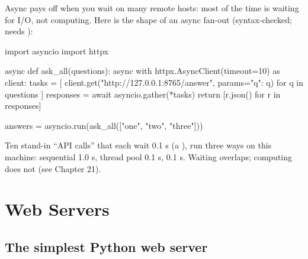 Async pays off when you wait on many remote hosts: most of the time is waiting for I/O, not
computing. Here is the shape of an async fan-out (syntax-checked; needs ):

\begin{pycode}
import asyncio
import httpx

async def ask_all(questions):
    async with httpx.AsyncClient(timeout=10) as client:
        tasks = [
            client.get("http://127.0.0.1:8765/answer", params={"q": q})
            for q in questions
        ]
        responses = await asyncio.gather(*tasks)
    return [r.json() for r in responses]

answers = asyncio.run(ask_all(["one", "two", "three"]))
\end{pycode}

\begin{center}
\end{center}

\begin{lab}
Ten stand-in ``API calls'' that each wait 0.1 s (a ), run three ways on this machine:
sequential 1.0 s, thread pool 0.1 s,  0.1 s. Waiting overlaps; computing
does not (see Chapter 21).
\end{lab}

\section{Web Servers}

\subsection{The simplest Python web server}

